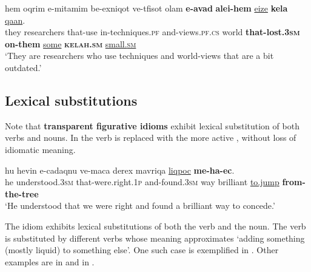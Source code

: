 \documentclass[output=paper]{langsci/langscibook}
\begin{document}
    \ea\label{kelax-ins-int-mod-quant}
        \gll hem {\het}oqrim {\shin}e-mi{\shin}tam{\shin}im be-{\tet}exniqot ve-tfisot {\ayin}olam \textbf{{\shin}e-{\alef}avad} \textbf{{\ayin}alei-hem} \underline{{\alef}eize} \textbf{kela{\het}} \underline{qa{\tet}an}.\\
            they researchers that-use in-techniques.\textsc{pf} and-views.\textsc{pf.cs} world \textbf{that-lost.\textsc{3sm}} \textbf{on-them} \underline{some} \textbf{\textsc{kelah}.\textsc{sm}} \underline{small.\textsc{sm}}\\
        \glt `They are researchers who use techniques and world-views that are a bit outdated.'
    \z



\subsection{Lexical substitutions}
\label{sec:ls}

Note that \textbf{transparent figurative idioms} exhibit lexical substitution of both verbs and nouns. In  the verb  is replaced with the more active , without loss of idiomatic meaning.

    \ea\label{ec-sub-verb}
        \gll hu hevin {\shin}e-cadaqnu ve-maca derex mavriqa \underline{liqpoc} \textbf{me-ha-{\ayin}ec}.\\
            he understood.\textsc{3sm} that-were.right.\textsc{1p} and-found.\textsc{3sm} way brilliant \underline{to.jump} \textbf{from-the-tree}\\
        \glt `He understood that we were right and found a brilliant way to concede.'
    \z

The idiom  exhibits lexical substitutions of both the verb and the noun. The verb  is substituted by different verbs whose meaning approximates `adding something (mostly liquid) to something else'. One such case is exemplified in . Other examples are  in  and  in .
\end{document}
